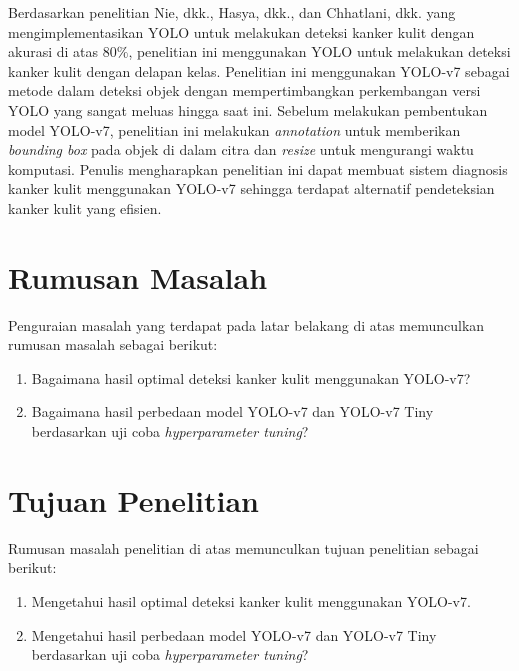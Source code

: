     Berdasarkan penelitian Nie, dkk., Hasya, dkk., dan Chhatlani, dkk. yang mengimplementasikan YOLO untuk melakukan deteksi kanker kulit dengan akurasi di atas $80\%$, penelitian ini menggunakan YOLO untuk melakukan deteksi kanker kulit dengan delapan kelas. Penelitian ini menggunakan YOLO-v7 sebagai metode dalam deteksi objek dengan mempertimbangkan perkembangan versi YOLO yang sangat meluas hingga saat ini. Sebelum melakukan pembentukan model YOLO-v7, penelitian ini melakukan \textit{annotation} untuk memberikan \textit{bounding box} pada objek di dalam citra dan \textit{resize} untuk mengurangi waktu komputasi. Penulis mengharapkan penelitian ini dapat membuat sistem diagnosis kanker kulit menggunakan YOLO-v7 sehingga terdapat alternatif pendeteksian kanker kulit yang efisien.

    \section{Rumusan Masalah}
    Penguraian masalah yang terdapat pada latar belakang di atas memunculkan rumusan masalah sebagai berikut:
    \begin{enumerate}
        \item Bagaimana hasil optimal deteksi kanker kulit menggunakan YOLO-v7?
        \item Bagaimana hasil perbedaan model YOLO-v7 dan YOLO-v7 Tiny berdasarkan uji coba \textit{hyperparameter tuning}?
    \end{enumerate}

    \section{Tujuan Penelitian}
    Rumusan masalah penelitian di atas memunculkan tujuan penelitian sebagai berikut:
    \begin{enumerate}
        \item Mengetahui hasil optimal deteksi kanker kulit menggunakan YOLO-v7.
        \item Mengetahui hasil perbedaan model YOLO-v7 dan YOLO-v7 Tiny berdasarkan uji coba \textit{hyperparameter tuning}?
    \end{enumerate}

